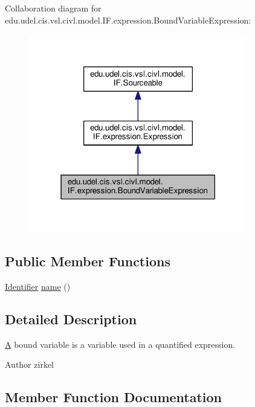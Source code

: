 Collaboration diagram for edu.\+udel.\+cis.\+vsl.\+civl.\+model.\+I\+F.\+expression.\+Bound\+Variable\+Expression\+:
\nopagebreak
\begin{figure}[H]
\begin{center}
\leavevmode
\includegraphics[width=271pt]{interfaceedu_1_1udel_1_1cis_1_1vsl_1_1civl_1_1model_1_1IF_1_1expression_1_1BoundVariableExpression__coll__graph}
\end{center}
\end{figure}
\subsection*{Public Member Functions}
\begin{DoxyCompactItemize}
\item 
\hyperlink{interfaceedu_1_1udel_1_1cis_1_1vsl_1_1civl_1_1model_1_1IF_1_1Identifier}{Identifier} \hyperlink{interfaceedu_1_1udel_1_1cis_1_1vsl_1_1civl_1_1model_1_1IF_1_1expression_1_1BoundVariableExpression_ae4fca2fde9257f55cd1ec96f1fcb41f5}{name} ()
\end{DoxyCompactItemize}


\subsection{Detailed Description}
\hyperlink{structA}{A} bound variable is a variable used in a quantified expression. 

\begin{DoxyAuthor}{Author}
zirkel 
\end{DoxyAuthor}


\subsection{Member Function Documentation}
\hypertarget{interfaceedu_1_1udel_1_1cis_1_1vsl_1_1civl_1_1model_1_1IF_1_1expression_1_1BoundVariableExpression_ae4fca2fde9257f55cd1ec96f1fcb41f5}{}
